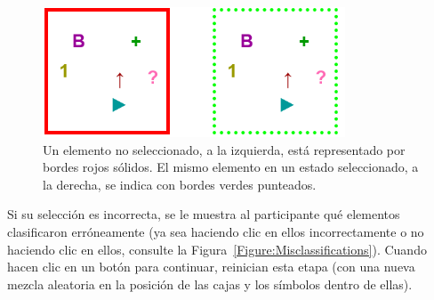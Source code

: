 \begin{figure}[h!] 
\begin{center}
    	\includegraphics[scale=0.6]{../figuras/brm/SelectionSeparadosIguales.png}
	\caption{
	Un elemento no seleccionado, a la izquierda, está representado por bordes rojos sólidos. El mismo elemento en un estado seleccionado, a la derecha, se indica con bordes verdes punteados.}
	\label{Figure:ElementSquares}
\end{center}
\end{figure}

Si su selección es incorrecta, se le muestra al participante qué elementos clasificaron erróneamente (ya sea haciendo clic en ellos incorrectamente o no haciendo clic en ellos, consulte la Figura~\ref{Figure:Misclassifications}). Cuando hacen clic en un botón para continuar, reinician esta etapa (con una nueva mezcla aleatoria en la posición de las cajas y los símbolos dentro de ellas).

